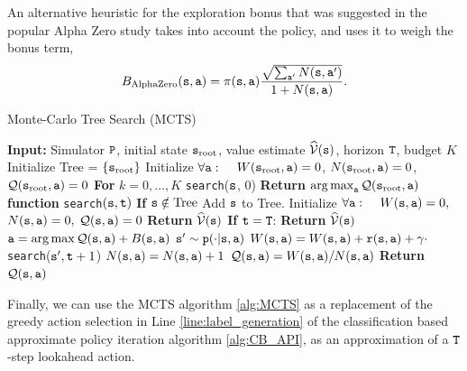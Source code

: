 An alternative heuristic for the exploration bonus that was suggested in the popular Alpha Zero study takes into account the policy, and uses it to weigh the bonus term, 
\begin{equation*}
    B_{\textrm{AlphaZero}}({\tt s},{\tt a}) = \pi({\tt s},{\tt a})\frac{\sqrt{\sum_{{\tt a}'} N({\tt s},{\tt a}')}}{1+N({\tt s},{\tt a})}.
\end{equation*}

\begin{algorithm}[H]
\caption{Monte-Carlo Tree Search (MCTS)}\label{alg:MCTS}
\begin{algorithmic}[1]
\State \textbf{Input:} Simulator ${\tt P}$, initial state ${\tt s}_{\textrm{root}}$, value estimate $\widehat{\mathcal{V}}({\tt s})$, horizon ${\tt T}$, budget $K$
 \State Initialize Tree = $\{ {\tt s}_{\textrm{root}}\}$
 \State Initialize $\forall {\tt a}: \quad $ $W({\tt s}_{\textrm{root}},{\tt a}) = 0$, $N({\tt s}_{\textrm{root}},{\tt a}) = 0$, 
 $\mathcal{Q}({\tt s}_{\textrm{root}},{\tt a}) = 0$ 
 \State \textbf{For} {$k = 0,\dots,K$ }
 \State \quad \texttt{search}(${\tt s}$, 0)
 \State \textbf{Return} $\argmax_\action \QValue(\state_{\textrm{root}},\action)$
 \\
 \State 
 \textbf{function} \texttt{search}$({\tt s},{\tt t})$
\State \quad \textbf{If} ${\tt s} \notin \textrm{Tree}$
\State \quad \quad Add ${\tt s}$ to Tree.
\State \quad \quad Initialize $\forall {\tt a}: \quad $ $W({\tt s},{\tt a}) = 0,$ 
$N({\tt s},{\tt a}) = 0,$ 
$\mathcal{Q}({\tt s},{\tt a}) = 0$ 
\State \quad \quad \textbf{Return} $\widehat{\mathcal{V}}({\tt s})$
\State \quad \textbf{If} ${\tt t} = {\tt T}$:
\State \quad \quad \textbf{Return} $\widehat{\mathcal{V}}({\tt s})$
\State \quad $\action = \argmax \QValue(\state, \action) + B(\state,\action)$
\State \quad ${\tt s}' \sim {\tt p}(\cdot|{\tt s},{\tt a})$
\State \quad $W({\tt s},{\tt a}) = W({\tt s},{\tt a}) + {\tt r}({\tt s},{\tt a}) + \gamma\cdot$\texttt{search}(${\tt s}', {\tt t}+1$)
\State \quad $N({\tt s},{\tt a}) = N({\tt s},{\tt a}) + 1$
\State \quad $\mathcal{Q}({\tt s}, {\tt a}) = W({\tt s},{\tt a}) / N({\tt s},{\tt a})$
\State \quad \textbf{Return} $\mathcal{Q}({\tt s}, {\tt a})$
\end{algorithmic}
\end{algorithm}


Finally, we can use the MCTS algorithm \ref{alg:MCTS} as a replacement of the greedy action selection in Line \ref{line:label_generation} of the classification based approximate policy iteration algorithm \ref{alg:CB_API}, as an approximation of a ${\tt T}$-step lookahead action.

